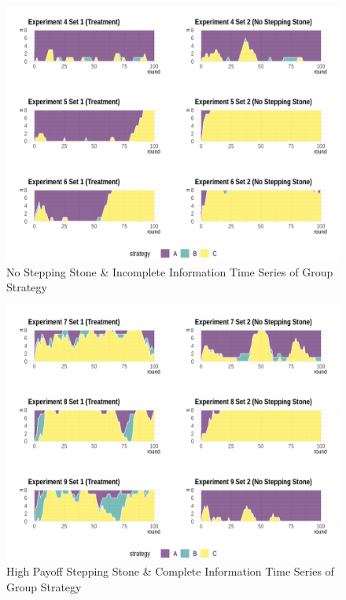 \begin{figure}[h]
\captionsetup{justification=centering}
  \caption[caption]{No Stepping Stone \& Incomplete Information Time Series of Group Strategy}
   \label{fig:Series1I}
    \includegraphics[width = \textwidth]{Images/AllAreaPlot1I.png}
    
\end{figure}

\begin{figure}[h]
\captionsetup{justification=centering}
  \caption[caption]{High Payoff Stepping Stone \& Complete Information Time Series of Group Strategy}
   \label{fig:Series2C}
    \includegraphics[width = \textwidth]{Images/AllAreaPlot2C.png}
    
\end{figure}

